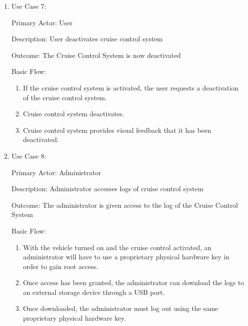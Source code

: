 \documentclass[preprint,11pt,3p]{article}
\begin{document}
\begin{enumerate}
\begin{enumerate}
		\end{enumerate}
	\item 	Use Case 7:\par
			Primary Actor: User \par
			Description:  User deactivates cruise control system\par
			Outcome: The Cruise Control System is now deactivated\par
			Basic Flow:
		\begin{enumerate}
			\item If the cruise control system is activated, the user requests a deactivation of the cruise control system.
			\item Cruise control system deactivates.
			\item Cruise control system provides visual feedback that it has been deactivated.
		\end{enumerate}
	\item 	Use Case 8: \par
			Primary Actor: Administrator\par
			Description: Administrator accesses logs of cruise control system\par
			Outcome: The administrator is given access to the log of the Cruise Control System\par
			Basic Flow:
		\begin{enumerate}
			\item With the vehicle turned on and the cruise control activated, an administrator will have to use a proprietary physical hardware key in order to gain root access.
			\item Once access has been granted, the administrator can download the logs to an external storage device through a USB port.
			\item Once downloaded, the administrator must log out using the same proprietary physical hardware key.
		\end{enumerate}
\end{enumerate}
\end{document}
